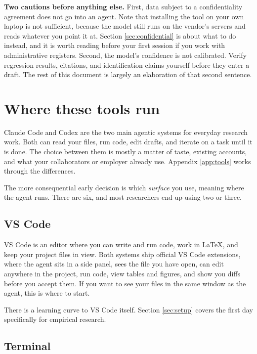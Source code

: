 \documentclass[11pt,a4paper]{article}
\begin{document}
\begin{aside}
\textbf{Two cautions before anything else.} First, data subject to a
confidentiality agreement does not go into an agent. Note that installing the
tool on your own laptop is not sufficient, because the model still runs on the
vendor's servers and reads whatever you point it at. Section
\ref{sec:confidential} is about what to do instead, and it is worth reading
before your first session if you work with administrative registers. Second, the
model's confidence is not calibrated. Verify regression results, citations, and
identification claims yourself before they enter a draft. The rest of this
document is largely an elaboration of that second sentence.
\end{aside}

\section{Where these tools run}
\label{sec:surfaces}

Claude Code and Codex are the two main agentic systems for everyday research
work. Both can read your files, run code, edit drafts, and iterate on a task
until it is done. The choice between them is mostly a matter of taste, existing
accounts, and what your collaborators or employer already use. Appendix
\ref{app:tools} works through the differences.

The more consequential early decision is which \emph{surface} you use, meaning
where the agent runs. There are six, and most researchers end
up using two or three.

\subsection{VS Code}

VS Code is an editor where you can write and run code, work in LaTeX, and keep
your project files in view. Both systems ship official VS Code extensions, where
the agent sits in a side panel, sees the file you have open, can edit anywhere in
the project, run code, view tables and figures, and show you diffs before you
accept them. If you want to see your files in the same window as the agent, this
is where to start.

There is a learning curve to VS Code itself. Section \ref{sec:setup} covers the
first day specifically for empirical research.

\subsection{Terminal}
\end{document}
